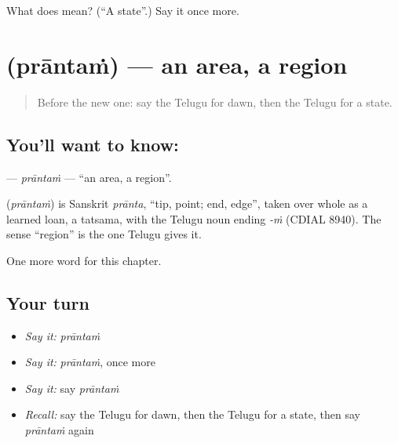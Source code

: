 \begin{tcolorbox}[breakable,colback=teal!4,colframe=teal!35!black,title={Before you move on}]
What does  mean? (\textquotedblleft{}A state\textquotedblright{}.) Say it once more.
\end{tcolorbox}
\section[\texorpdfstring{\te{ప్రాంతం} (prāntaṁ)}{ప్రాంతం (prāntaṁ)}]{ (prāntaṁ) — an area, a region}

\label{lesson:TE-C254-prantam}



\begin{quote}
Before the new one: say the Telugu for dawn, then the Telugu for a state.
\end{quote}

\subsection*{You'll want to know: }
\textbf{} — \emph{prāntaṁ} — \textquotedblleft{}an area, a region\textquotedblright{}.

\begin{cousinweb}
\textbf{} (\emph{prāntaṁ}) is Sanskrit \emph{prānta}, \textquotedblleft{}tip, point; end, edge\textquotedblright{}, taken over whole as a learned loan, a tatsama, with the Telugu noun ending \emph{-ṁ} (CDIAL 8940). The sense \textquotedblleft{}region\textquotedblright{} is the one Telugu gives it.
\end{cousinweb}

\begin{grammarlens}[title={What you've built}]
One more word for this chapter.
\end{grammarlens}

\subsection*{Your turn}
\begin{itemize}
\raggedright
  \item \emph{Say it:} \emph{prāntaṁ}
  \item \emph{Say it:} \emph{prāntaṁ}, once more
  \item \emph{Say it:} say \emph{prāntaṁ}
  \item \emph{Recall:} say the Telugu for dawn, then the Telugu for a state, then say \emph{prāntaṁ} again
\end{itemize}

